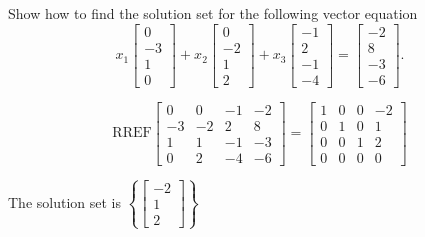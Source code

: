
\begin{exerciseStatement}


Show how to find the solution set for the following vector equation \[ x_{1} \left[\begin{array}{c}
0 \\
-3 \\
1 \\
0
\end{array}\right] + x_{2} \left[\begin{array}{c}
0 \\
-2 \\
1 \\
2
\end{array}\right] + x_{3} \left[\begin{array}{c}
-1 \\
2 \\
-1 \\
-4
\end{array}\right] = \left[\begin{array}{c}
-2 \\
8 \\
-3 \\
-6
\end{array}\right] .\]


\end{exerciseStatement}
    
\begin{exerciseAnswer} 
\[\mathrm{RREF} \left[\begin{array}{ccc|c}
0 & 0 & -1 & -2 \\
-3 & -2 & 2 & 8 \\
1 & 1 & -1 & -3 \\
0 & 2 & -4 & -6
\end{array}\right]  =  \left[\begin{array}{ccc|c}
1 & 0 & 0 & -2 \\
0 & 1 & 0 & 1 \\
0 & 0 & 1 & 2 \\
0 & 0 & 0 & 0
\end{array}\right] \]

The solution set is \( \left\{ \left[\begin{array}{c}
-2 \\
1 \\
2
\end{array}\right] \right\} \)


\end{exerciseAnswer}
    
